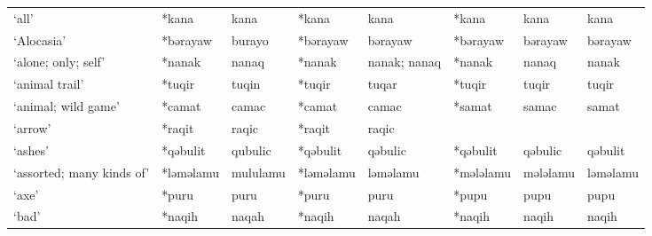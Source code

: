 \begin{landscape}
\begin{longtable}[c]{@{}p{3cm}<{\raggedright}p{2.75cm}<{\raggedright}p{2.75cm}<{\raggedright}p{2.75cm}<{\raggedright}p{2.75cm}<{\raggedright}p{2.75cm}<{\raggedright}p{2.75cm}<{\raggedright}p{2.75cm}<{\raggedright}@{}}
`all'                                                & *kana        & kana                          & *kana          & kana                       & *kana            & kana                     & kana                              \\
`Alocasia'                                           & *bərayaw     & burayo                        & *bərayaw       & bərayaw                    & *bərayaw         & bərayaw                  & bərayaw                           \\
`alone; only; self'                                  & *nanak       & nanaq                         & *nanak         & nanak; nanaq               & *nanak           & nanaq                    & nanak                             \\
`animal trail'                                       & *tuqir       & tuqin                         & *tuqir         & tuqar                      & *tuqir           & tuqir                    & tuqir                             \\
`animal; wild game'                                  & *camat       & camac                         & *camat         & camac                      & *samat           & samac                    & samat                             \\
`arrow'                                              & *raqit       & raqic                         & *raqit         & raqic                      &                  &                          &                                   \\
`ashes'                                              & *qəbulit     & qubulic                       & *qəbulit       & qəbulic                    & *qəbulit         & qəbulic                  & qəbulit                           \\
`assorted; many kinds of'                            & *ləməlamu    & mululamu                      & *ləməlamu      & ləməlamu                   & *mələlamu        & mələlamu                 & ləməlamu                          \\
`axe'                                                & *puru        & puru                          & *puru          & puru                       & *pupu            & pupu                     & pupu                              \\
`bad'                                                & *naqih       & naqah                         & *naqih         & naqah                      & *naqih           & naqih                    & naqih                             \\

\end{longtable}
\end{landscape}
